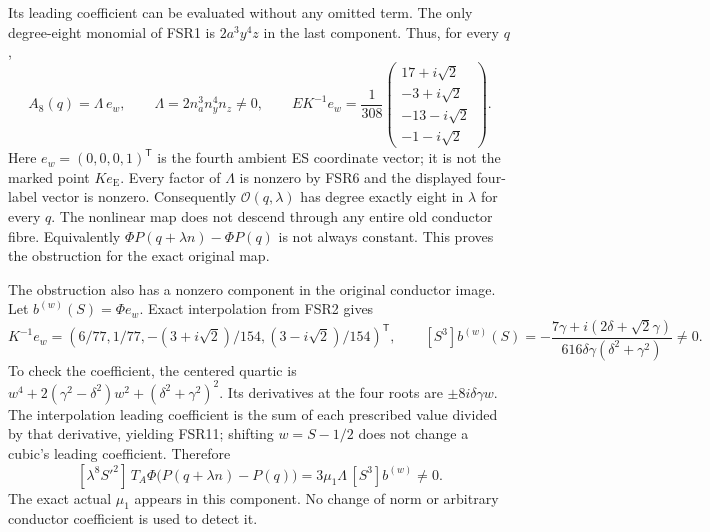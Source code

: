 Its leading coefficient can be evaluated without any omitted term.
The only degree-eight monomial of FSR1 is $2a^3y^4z$ in the last
component. Thus, for every $q$,
\[
 A_8(q)=\Lambda\,e_w,\qquad
 \Lambda=2n_a^3n_y^4n_z\ne0,
 \qquad
 EK^{-1}e_w=\frac1{308}
 \begin{pmatrix}17+i\sqrt2\\-3+i\sqrt2\\-13-i\sqrt2\\-1-i\sqrt2\end{pmatrix}.
 \tag{FSR10}
\]
Here $e_w=(0,0,0,1)^{\mathsf T}$ is the fourth ambient ES
coordinate vector; it is not the marked point $Ke_{\mathrm E}$.
Every factor of $\Lambda$ is nonzero by FSR6 and the displayed
four-label vector is nonzero. Consequently $\mathcal O(q,\lambda)$
has degree exactly eight in $\lambda$ for every $q$. The nonlinear
map does not descend through any entire old conductor fibre.
Equivalently $\Phi P(q+\lambda n)-\Phi P(q)$ is not always
constant. This proves the obstruction for the exact original map.

The obstruction also has a nonzero component in the original conductor
image. Let
$b^{(w)}(S)=\Phi e_w$. Exact interpolation from FSR2 gives
\[
 K^{-1}e_w=
 (6/77,1/77,-(3+i\sqrt2)/154,(3-i\sqrt2)/154)^{\mathsf T},
 \qquad
 [S^3]b^{(w)}(S)=
 -\frac{7\gamma+i(2\delta+\sqrt2\gamma)}
          {616\delta\gamma(\delta^2+\gamma^2)}\ne0.
 \tag{FSR11}
\]
To check the coefficient, the centered quartic is
$w^4+2(\gamma^2-\delta^2)w^2+(\delta^2+\gamma^2)^2$.
Its derivatives at the four roots are $\pm8i\delta\gamma w$.
The interpolation leading coefficient is the sum of each prescribed
value divided by that derivative, yielding FSR11; shifting $w=S-1/2$
does not change a cubic's leading coefficient. Therefore
\[
 [\lambda^8S'^2]\,T_A\Phi\bigl(P(q+\lambda n)-P(q)\bigr)
       =3\mu_1\Lambda\,[S^3]b^{(w)}\ne0.
 \tag{FSR12}
\]
The exact actual $\mu_1$ appears in this component. No change of
norm or arbitrary conductor coefficient is used to detect it.

